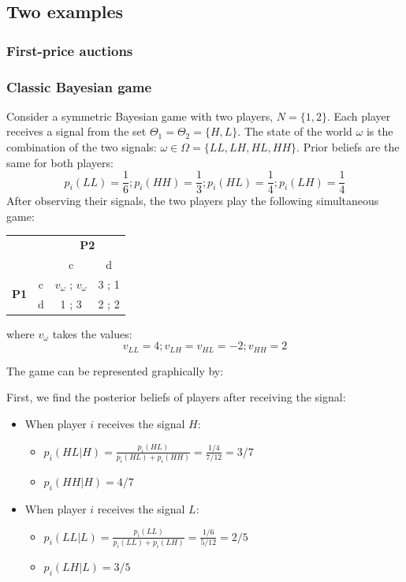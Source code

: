 \documentclass[12pt]{report}
\begin{document}
\subsection{Two examples}

\subsubsection{First-price auctions}

\subsubsection{Classic Bayesian game}

Consider a symmetric Bayesian game with two players, $N = \{1,2\}$. Each player receives a signal from the set $\Theta_1 = \Theta_2 = \{H, L\}$. The state of the world $\omega$ is the combination of the two signals: $\omega\in\Omega = \{LL, LH, HL, HH\}$. Prior beliefs are the same for both players: $$p_i(LL) = \frac{1}{6} ; p_i(HH) = \frac{1}{3} ; p_i(HL) = \frac{1}{4} ; p_i(LH) = \frac{1}{4} $$ After observing their signals, the two players play the following simultaneous game:\begin{table}[ht!]
\centering
\begin{tabular}{cccc}
 &  & \multicolumn{2}{c}{\textbf{P2}} \\ \cline{3-4} 
 & \multicolumn{1}{c|}{} & \multicolumn{1}{c|}{c} & \multicolumn{1}{c|}{d} \\ \cline{2-4} 
\multicolumn{1}{c|}{\multirow{2}{*}{\textbf{P1}}} & \multicolumn{1}{c|}{c} & \multicolumn{1}{c|}{$v_\omega$ ; $v_\omega$} & \multicolumn{1}{c|}{3 ; 1} \\ \cline{2-4} 
\multicolumn{1}{c|}{} & \multicolumn{1}{c|}{d} & \multicolumn{1}{c|}{1 ; 3} & \multicolumn{1}{c|}{2 ; 2} \\ \cline{2-4} 
\end{tabular}
\end{table}

where $v_\omega$ takes the values: $$v_{LL} = 4 ; v_{LH} = v_{HL} = -2  ; v_{HH} = 2$$

The game can be represented graphically by:


First, we find the posterior beliefs of players after receiving the signal: \begin{itemize}
\item When player $i$ receives the signal $H$:\begin{itemize}
\item $p_i(HL\vert H) = \frac{p_i(HL)}{p_i(HL) + p_i(HH)} = \frac{1/4}{7/12} = 3/7$
\item $p_i(HH\vert H) = 4/7$
\end{itemize}
\item When player $i$ receives the signal $L$:\begin{itemize}
\item $p_i(LL\vert L) = \frac{p_i(LL)}{p_i(LL) + p_i(LH)} = \frac{1/6}{5/12} = 2/5$
\item $p_i(LH\vert L) =3/5$
\end{itemize}
\end{itemize}
\end{document}
